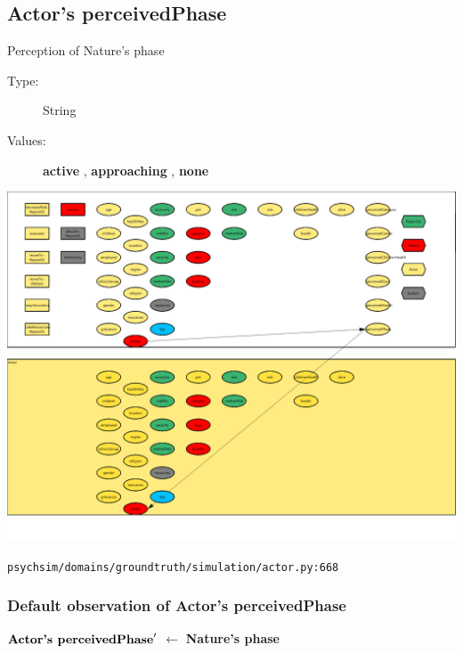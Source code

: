 \documentclass{article}%
\begin{document}
\subsection{Actor's perceivedPhase}%
\label{subsec:Actor's perceivedPhase}%
Perception of Nature's phase%
\begin{description}%
\item[Type:]%
String%
\item[Values:]%
\textbf{active}%
, %
\textbf{approaching}%
, %
\textbf{none}%
\end{description}%
\includegraphics[width=\textwidth]{images/perceivedPhaseOfActor.png}%
\begin{flushleft}%
\verb|psychsim/domains/groundtruth/simulation/actor.py:668|%
\end{flushleft}%
\subsubsection{Default observation of Actor's perceivedPhase}%
\label{ssubsec:Default observation of Actor's perceivedPhase}%
\begin{flushleft}%
$\mbox{\textbf{Actor's perceivedPhase}} '$%
$\leftarrow$%
\textbf{Nature's phase}%
\end{flushleft}

%
\end{document}
